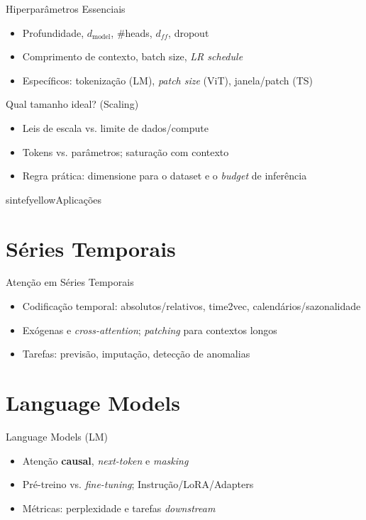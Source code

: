 \documentclass{beamer}
\begin{document}
\begin{frame}{Hiperparâmetros Essenciais}
\begin{itemize}[<+->]
  \item Profundidade, $d_{\text{model}}$, \#heads, $d_{ff}$, dropout
  \item Comprimento de contexto, batch size, \textit{LR schedule}
  \item Específicos: tokenização (LM), \textit{patch size} (ViT), janela/patch (TS)
\end{itemize}
\end{frame}

\begin{frame}{Qual tamanho ideal? (Scaling)}
\begin{itemize}[<+->]
  \item Leis de escala vs. limite de dados/compute
  \item Tokens vs. parâmetros; saturação com contexto
  \item Regra prática: dimensione para o dataset e o \textit{budget} de inferência
\end{itemize}
\end{frame}

\begin{chapter}{sintefyellow}{Aplicações}\end{chapter}

\section{Séries Temporais}
\begin{frame}{Atenção em Séries Temporais}
\begin{itemize}[<+->]
  \item Codificação temporal: absolutos/relativos, time2vec, calendários/sazonalidade
  \item Exógenas e \textit{cross-attention}; \textit{patching} para contextos longos
  \item Tarefas: previsão, imputação, detecção de anomalias
\end{itemize}
\end{frame}

\section{Language Models}
\begin{frame}{Language Models (LM)}
\begin{itemize}[<+->]
  \item Atenção \textbf{causal}, \textit{next-token} e \textit{masking}
  \item Pré-treino vs. \textit{fine-tuning}; Instrução/LoRA/Adapters
  \item Métricas: perplexidade e tarefas \textit{downstream}
\end{itemize}
\end{frame}
\end{document}

